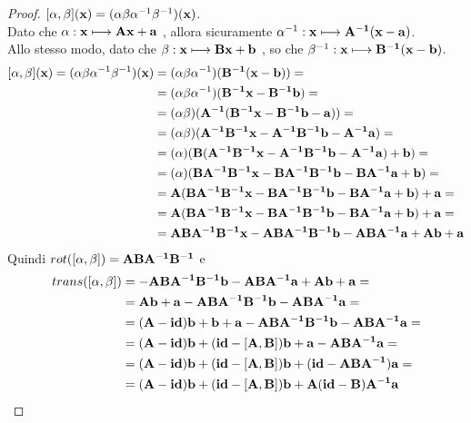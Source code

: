 \documentclass[a4paper,11pt,openright,twoside	]{book}
\begin{document}
\begin{proof}
	$ [ \alpha, \beta ](\vb{x}) = ( \alpha \beta \alpha^{-1} \beta^{-1} ) (\vb{x})$. \\
	Dato che $ \alpha : \vb{x} \longmapsto \vb{Ax + a}$ , allora sicuramente  $\alpha^{-1}: \vb{x} \longmapsto \vb{A^{-1}(x-a)}$.  \\
	Allo stesso modo, dato che $ \beta : \vb{x} \longmapsto \vb{Bx + b}$ , so che $\beta^{-1}: \vb{x} \longmapsto \vb{B^{-1}(x-b)}$. 
\begin{equation*}
\begin{split}
[ \alpha, \beta ](\vb{x}) = (\alpha \beta \alpha^{-1} \beta^{-1} ) (\vb{x})
& = (\alpha \beta \alpha^{-1})( \vb{B^{-1}(x-b)}) = \\ 
& = (\alpha \beta \alpha^{-1})( \vb{B^{-1}x- B^{-1}b }) = \\ 
& = (\alpha \beta)(\vb{A^{-1}( B^{-1}x- B^{-1}b -a)})= \\
& =  (\alpha \beta)(\vb{A^{-1} B^{-1}x- A^{-1}B^{-1}b -A^{-1}a})  = \\
& = (\alpha)(\vb{B(A^{-1} B^{-1}x- A^{-1}B^{-1}b -A^{-1}a) +b}) = \\
& = (\alpha)(\vb{BA^{-1} B^{-1}x-BA^{-1}B^{-1}b -BA^{-1}a +b}) = \\
& = \vb{A(BA^{-1} B^{-1}x-BA^{-1}B^{-1}b -BA^{-1}a +b) + a} = \\
& = \vb{A(BA^{-1} B^{-1}x-BA^{-1}B^{-1}b -BA^{-1}a +b) + a} = \\
& = \vb{ABA^{-1} B^{-1}x-ABA^{-1}B^{-1}b -ABA^{-1}a +Ab + a }
\end{split}
\end{equation*}
Quindi $ rot([ \alpha , \beta ]) = \vb{ABA^{-1} B^{-1} }$ e
\begin{equation*}
\begin{split}
trans([ \alpha, \beta ]) & = \vb{-ABA^{-1}B^{-1}b -ABA^{-1}a +Ab + a }= \\
& = \vb{Ab + a -ABA^{-1}B^{-1}b -ABA^{-1}a }= \\
& = \vb{(A-id)b + b + a -ABA^{-1}B^{-1}b -ABA^{-1}a} = \\
& = \vb{(A-id)b + (id-[A,B])b + a - ABA^{-1}a} = \\
& = \vb{(A-id)b + (id-[A,B])b + (id- ABA^{-1})a }= \\
& = \vb{(A-id)b + (id-[A,B])b + A(id- B)A^{-1}a} 
\end{split}
\end{equation*}	
\end{proof}
\end{document}
